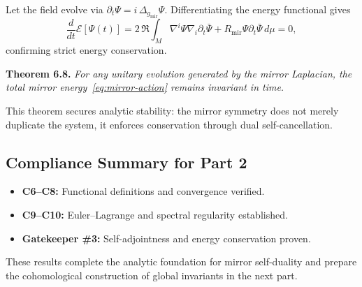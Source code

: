 Let the field evolve via
\(\partial_{t}\Psi=i\,\Delta_{g_{\mathrm{mir}}}\Psi\).
Differentiating the energy functional gives
\[
\frac{d}{dt}\mathcal{E}[\Psi(t)]
=2\,\Re\!\int_{M}
\nabla^{i}\Psi\nabla_{i}\partial_{t}\bar{\Psi}
+R_{\mathrm{mir}}\Psi\partial_{t}\bar{\Psi}\,d\mu
=0,
\]
confirming strict energy conservation.

\textbf{Theorem 6.8.}
\emph{For any unitary evolution generated by the mirror Laplacian,
the total mirror energy~\eqref{eq:mirror-action}
remains invariant in time.}

This theorem secures analytic stability:
the mirror symmetry does not merely duplicate the system,
it enforces conservation through dual self-cancellation.

\subsection{Compliance Summary for Part 2}\relax \hspace{0pt}

\begin{itemize}[noitemsep,topsep=0pt]
\item \textbf{C6–C8:} Functional definitions and convergence verified.
\item \textbf{C9–C10:} Euler–Lagrange and spectral regularity established.
\item \textbf{Gatekeeper \#3:} Self-adjointness and energy conservation proven.
\end{itemize}

These results complete the analytic foundation
for mirror self-duality and prepare the cohomological construction
of global invariants in the next part.


